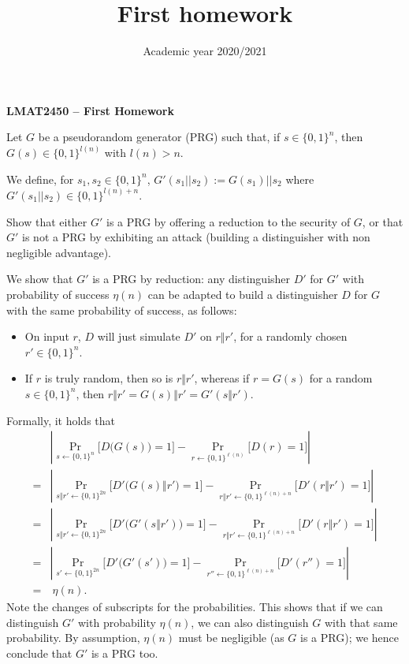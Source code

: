 \documentclass[12pt, answers]{exam}
\title{First homework}
\date{Academic year 2020/2021}
\newcommand{\abs}[1]{\left\lvert#1\right\lvert}
\begin{document}
\begin{center}
\Large \bfseries
LMAT2450 -- First Homework\\
\smallskip
\end{center}

\begin{questions}

	Let $G$ be a pseudorandom generator (PRG) such that, if $s\in\{0,1\}^n$, then $G(s)\in\{0,1\}^{l(n)}$ with $l(n)>n$.
	
	We define, for $s_1,s_2\in\{0,1\}^n$, $G'(s_1||s_2):=G(s_1)||s_2$ where $G'(s_1||s_2)\in \{0,1\}^{l(n)+n}$.
	
	Show that either $G'$ is a PRG by offering a reduction to the
        security of $G$, or that $G'$ is not a PRG by exhibiting an
        attack (building a distinguisher with non negligible
        advantage).
	
\begin{solutionbox}{15cm}
We show that \(G'\) is a PRG by reduction: any distinguisher \(D'\) for \(G'\) with probability of success \(\eta(n)\) can be adapted to build a distinguisher \(D\) for \(G\) with the same probability of success, as follows:
\begin{itemize}
	\item On input \(r\), \(D\) will just simulate \(D'\) on \(r \Vert r'\), for a randomly chosen \(r' \in \{0, 1\}^n\).
	\item If \(r\) is truly random, then so is \(r \Vert r'\), whereas if \(r = G(s)\) for a random \(s \in \{0, 1\}^{n}\), then \(r \Vert r' = G(s) \Vert r' = G'(s \Vert r')\).
\end{itemize}
Formally, it holds that
\begin{align*}
&\abs{\Pr_{s \gets \{0, 1\}^n} \Big[D\big(G(s)\big) = 1\Big] - \Pr_{r \gets \{0, 1\}^{\ell(n)}} \Big[D(r) = 1\Big]}\\
= &\abs{\Pr_{s \Vert r' \gets \{0, 1\}^{2n}} \Big[D'\big(G(s) \Vert r'\big) = 1\Big] - \Pr_{r \Vert r' \gets \{0, 1\}^{\ell(n) + n}} \Big[D'(r \Vert r') = 1\Big]}\\
= &\abs{\Pr_{s \Vert r' \gets \{0, 1\}^{2n}} \Big[D'\big(G'(s \Vert r')\big) = 1\Big] - \Pr_{r \Vert r' \gets \{0, 1\}^{\ell(n) + n}} \Big[D'(r \Vert r') = 1\Big]}\\
= &\abs{\Pr_{s' \gets \{0, 1\}^{2n}} \Big[D'\big(G'(s')\big) = 1\Big] - \Pr_{r'' \gets \{0, 1\}^{\ell(n) + n}} \Big[D'(r'') = 1\Big]}\\
= &\:\eta(n).
\end{align*}
Note the changes of subscripts for the probabilities.
This shows that if we can distinguish \(G'\) with probability \(\eta(n)\), we can also distinguish \(G\) with that same probability.
By assumption, \(\eta(n)\) must be negligible (as \(G\) is a PRG); we hence conclude that \(G'\) is a PRG too.
\end{solutionbox}


\end{questions}
\end{document}
